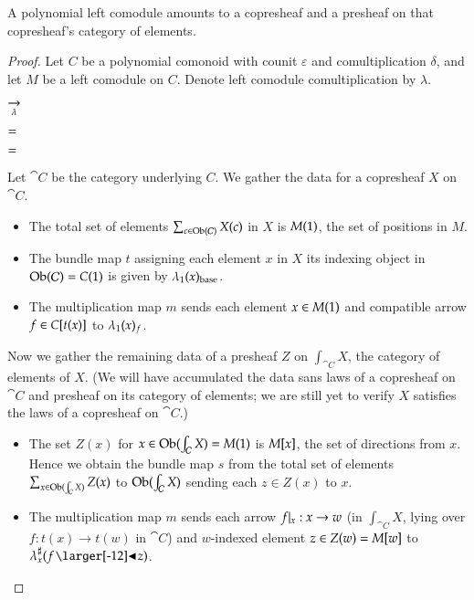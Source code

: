 \documentclass{amsart}
\begin{document}
\begin{prop}
  A polynomial left comodule amounts to a copresheaf and a presheaf on that
  copresheaf's category of elements.
\end{prop}
\begin{proof}
  Let $C$ be a polynomial comonoid with counit $\varepsilon$ and
  comultiplication $\delta$, and let $M$ be a left comodule on
  $C$. Denote left comodule comultiplication by $\lambda$.

  \begin{center}
    
    \hspace{-.75em}
    $\underset{\lambda}{\to}$
    \hspace{.5em}
    
  \end{center}

  \begin{center}
    
    \quad
    $=$
    
  \end{center}
  
  \begin{center}
    
    \quad
    $=$
    \quad
    
  \end{center}

  Let $\cat{C}$ be the category underlying $C$. We gather the
  data for a copresheaf $X$ on $\cat{C}$.
  \begin{itemize}
  \item The total set of elements $\sum_{c \in \operatorname{Ob}(\mathcal{C})}X(c)$ in
    $X$ is $M(1)$, the set of positions in $M$.
  \item The bundle map $t$ assigning each element $x$ in $X$ its indexing
    object in $\operatorname{Ob}(\mathcal{C}) = C(1)$ is given by ${\lambda}_1(x)_{\mathrm{base}}$.
  \item The multiplication map $m$ sends each element $x \in M(1)$
    and compatible arrow $f \in C[t(x)]$ to
    ${\lambda}_1(x)_f$.
  \end{itemize}

  Now we gather the remaining data of a presheaf $Z$ on
  $\int_{\cat{C}}X$, the category of elements of $X$. (We will have
  accumulated the data sans laws of a copresheaf on $\cat{C}$ and
  presheaf on its category of elements; we are still yet to
  verify $X$ satisfies the laws of a copresheaf on $\cat{C}$.)
  \begin{itemize}
  \item The set $Z(x)$ for $x \in \operatorname{Ob}(\int_{\mathcal{C}}X) = M(1)$ is
    $M[x]$, the set of directions from $x$. Hence we obtain the
    bundle map $s$ from the total set of elements
    $\sum_{x \in \operatorname{Ob}(\int_{\mathcal{C}}X)}Z(x)$ to $\operatorname{Ob}(\int_{\mathcal{C}}X)$
    sending each $z \in Z(x)$ to $x$.
  \item The multiplication map $m$ sends each arrow $f|_{x}: x \to w$
    (in $\int_{\cat{C}}X$, lying over $f: t(x) \to t(w)$ in $\cat{C}$)
    and $w$-indexed element $z \in Z(w) = M[w]$ to
    $\dirmapof{\lambda}{x}{f \subd z}$.


\end{itemize}
\end{proof}
\end{document}
